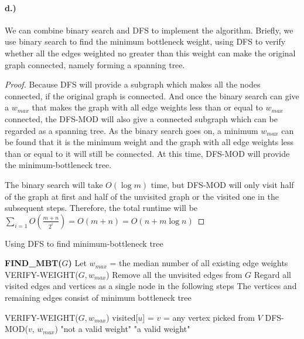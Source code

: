 \documentclass[a4paper,12pt]{article}
\begin{document}
\paragraph*{d.)} We can combine binary search and DFS to implement
the algorithm. Briefly, we use binary search to find the minimum 
bottleneck weight, using DFS to verify whether all the edges weighted 
no greater than this weight can make the original graph connected,
namely forming a spanning tree. 

\begin{proof}
Because DFS will provide a subgraph which makes all the nodes 
connected, if the original graph is connected. And once the binary
search can give a $w_{max}$ that makes the graph with all edge weights
less than or equal to $w_{max}$ connected, the DFS-MOD will also give
a connected subgraph which can be regarded as a spanning tree. As 
the binary search goes on, a minimum $w_{max}$ can be found that
it is the minimum weight and the graph with all edge weights less than
or equal to it will still be connected. At this time, DFS-MOD will provide
the minimum-bottleneck tree.

The binary search will take $O(\log m)$ time, but DFS-MOD will only
visit half of the graph at first and half of the unvisited graph or the
visited one in the subsequent steps. Therefore, the total runtime
will be $\sum\limits_{i=1}O(\frac{m+n}{2^i}) = O(m+n)=O(n+m\log n)$
\end{proof}

\begin{algorithm}
\caption{Using DFS to find minimum-bottleneck tree}
\begin{algorithmic}
\STATE \textbf{FIND\_MBT($G$)}
\STATE Let $w_{max}$ = the median number of all existing edge 
weights
\STATE VERIFY-WEIGHT($G, w_{max}$)
    \STATE Remove all the unvisited edges from $G$
\ELSE 
    \STATE Regard all visited edges and vertices as a single node in the
following steps
\ENDIF
\ENDWHILE
\STATE The vertices and remaining edges consist of minimum 
bottleneck tree
\end{algorithmic}
\end{algorithm}

\begin{algorithm}
\begin{algorithmic}
\STATE VERIFY-WEIGHT($G, w_{max}$)
    \STATE visited[$u$] = \FALSE
\ENDFOR
\STATE $v$ = any vertex picked from $V$
\STATE DFS-MOD($v$, $w_{max}$)
        \RETURN "not a valid weight"
        \ELSE \RETURN "a valid weight"
    \ENDIF
\ENDFOR
\end{algorithmic}
\end{algorithm}
\end{document}

